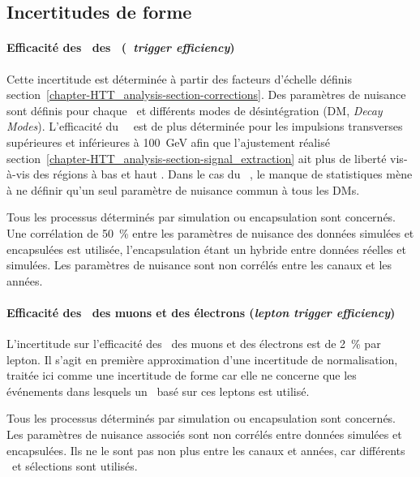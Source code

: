 \subsection{Incertitudes de forme}\label{chapter-HTT_analysis-section-systematics-shapes}
\paragraph{Efficacité des \HLTpaths\ des \tauh\ (\emph{\tauh\ trigger efficiency})}
Cette incertitude est déterminée à partir des facteurs d'échelle définis section~\ref{chapter-HTT_analysis-section-corrections}.
Des paramètres de nuisance sont définis pour chaque \HLTpath\ et différents modes de désintégration (DM, \emph{Decay Modes}). %
L'efficacité du \HLTpath\ \HLTDoubleTau\ est de plus déterminée pour les impulsions transverses supérieures et inférieures à \SI{100}{\GeV} afin que l'ajustement réalisé section~\ref{chapter-HTT_analysis-section-signal_extraction} ait plus de liberté vis-à-vis des régions à bas et haut \pT.
Dans le cas du \HLTpath\ \HLTSingleTau, le manque de statistiques mène à ne définir qu'un seul paramètre de nuisance commun à tous les DMs.
\par
Tous les processus déterminés par simulation ou encapsulation sont concernés.
Une corrélation de \SI{50}{\%} entre les paramètres de nuisance des données simulées et encapsulées est utilisée, l'encapsulation étant un hybride entre données réelles et simulées.
Les paramètres de nuisance sont non corrélés entre les canaux et les années.
\paragraph{Efficacité des \HLTpaths\ des muons et des électrons (\emph{lepton trigger efficiency})}
L'incertitude sur l'efficacité des \HLTpaths\ des muons et des électrons est de \SI{2}{\%} par lepton.
Il s'agit en première approximation d'une incertitude de normalisation, traitée ici comme une incertitude de forme car elle ne concerne que les événements dans lesquels un \HLTpath\ basé sur ces leptons est utilisé.
\par
Tous les processus déterminés par simulation ou encapsulation sont concernés.
Les paramètres de nuisance associés sont non corrélés entre données simulées et encapsulées.
Ils ne le sont pas non plus entre les canaux et années, car différents \HLTpaths\ et sélections sont utilisés.
